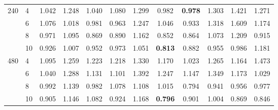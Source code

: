 \begin{table}
\begin{tabular}{llcccccccccc}
\multirow[t]{4}{*}{240} & 4 & 1.042 & 1.248 & 1.040 & 1.080 & 1.299 & 0.982 & \bfseries 0.978 & 1.303 & 1.421 & 1.271 \\
 & 6 & 1.076 & 1.018 & 0.981 & 0.963 & 1.247 & 1.046 & 0.933 & 1.318 & 1.609 & 1.174 \\
 & 8 & 0.971 & 1.095 & 0.869 & 0.890 & 1.162 & 0.852 & 0.864 & 1.073 & 1.209 & 0.915 \\
 & 10 & 0.926 & 1.007 & 0.952 & 0.973 & 1.051 & \bfseries 0.813 & 0.882 & 0.955 & 0.986 & 1.181 \\
\multirow[t]{4}{*}{480} & 4 & 1.095 & 1.259 & 1.223 & 1.218 & 1.330 & 1.170 & 1.023 & 1.265 & 1.164 & 1.473 \\
 & 6 & 1.040 & 1.288 & 1.131 & 1.101 & 1.392 & 1.247 & 1.147 & 1.349 & 1.173 & 1.029 \\
 & 8 & 0.992 & 1.139 & 0.982 & 1.078 & 1.108 & 1.015 & 0.794 & 0.941 & 0.956 & 0.977 \\
 & 10 & 0.905 & 1.146 & 1.082 & 0.924 & 1.168 & \bfseries 0.796 & 0.901 & 1.004 & 0.869 & 0.846 \\
\bottomrule
\end{tabular}
\end{table}
